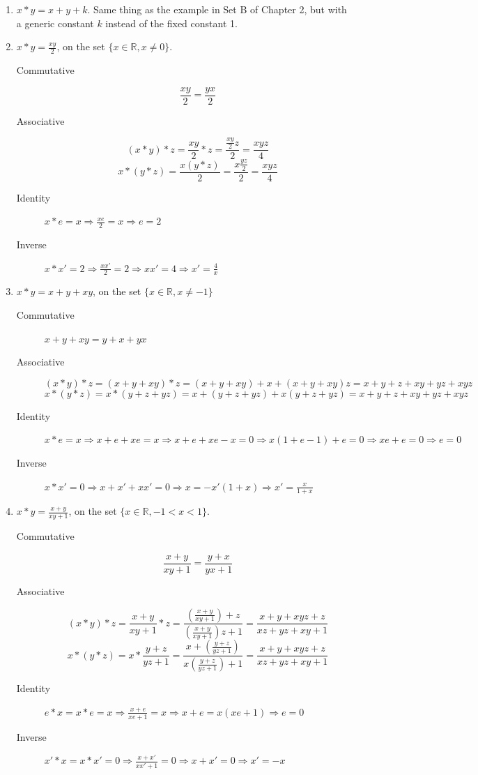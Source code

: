 \documentclass{article}
\begin{document}
\begin{enumerate}
    \item $x * y = x + y + k$. Same thing as the example in Set B of Chapter 2, but with a generic constant $k$ instead of the fixed constant 1.
    \item $x * y = \frac{xy}{2}$, on the set $\{x \in \mathbb{R}, x \ne 0\}$.
    \begin{description}
        \item [Commutative] 
            $$\frac{xy}{2} = \frac{yx}{2}$$
        \item [Associative]
        $$(x * y) * z = \frac{xy}{2} * z = \frac{\frac{xy}{2}z}{2} = \frac{xyz}{4}$$
        $$x * (y * z) = \frac{x(y * z)}{2} = \frac{x\frac{yz}{2}}{2} = \frac{xyz}{4}$$
        \item [Identity] $x * e = x \Rightarrow \frac{xe}{2} = x \Rightarrow e = 2$
        \item [Inverse] $x * x' = 2 \Rightarrow \frac{xx'}{2} = 2 \Rightarrow xx' = 4 \Rightarrow x' = \frac{4}{x}$
    \end{description}
    \item $x * y = x + y + xy$, on the set $\{x \in \mathbb{R}, x \ne -1\}$
    \begin{description}
        \item [Commutative] $x + y + xy = y + x + yx$
        \item [Associative]
        $$(x * y) * z = (x + y + xy) * z = (x + y + xy) + x + (x + y + xy)z = x + y + z + xy + yz + xyz$$
        $$x * (y * z) = x * (y + z + yz) = x + (y + z + yz) + x(y + z + yz) = x + y + z + xy + yz + xyz$$
        \item [Identity] $x * e = x \Rightarrow x + e + xe = x \Rightarrow x + e + xe - x = 0 \Rightarrow x(1 + e - 1) + e = 0 \Rightarrow xe + e = 0 \Rightarrow e = 0$
        \item [Inverse] $x * x' = 0 \Rightarrow x + x'+ xx' = 0 \Rightarrow x = -x'(1 + x) \Rightarrow x' = \frac{x}{1+x}$
    \end{description}
    \item $x * y = \frac{x + y}{xy + 1}$, on the set $\{x \in \mathbb{R}, -1 < x < 1\}$.
    \begin{description}
        \item [Commutative]
            $$\frac{x + y}{xy + 1} = \frac{y + x}{yx + 1}$$
        \item [Associative]
            $$(x * y) * z = \frac{x + y}{xy + 1} * z = \frac{\left(\frac{x + y}{xy + 1}\right) + z}{\left(\frac{x + y}{xy + 1}\right)z + 1} = \frac{x + y + xyz + z}{xz + yz + xy + 1}$$
            $$x * (y * z) = x * \frac{y + z}{yz + 1} = \frac{x + \left(\frac{y + z}{yz + 1}\right)}{x\left(\frac{y + z}{yz + 1}\right) + 1} = \frac{x + y + xyz + z}{xz + yz + xy + 1}$$
        \item [Identity] $e * x = x * e = x \Rightarrow \frac{x + e}{xe + 1} = x \Rightarrow x + e = x(xe + 1) \Rightarrow e = 0$
        \item [Inverse] $x' * x = x * x' = 0 \Rightarrow \frac{x + x'}{xx' + 1} = 0 \Rightarrow x + x' = 0 \Rightarrow x' = -x$
    \end{description}
\end{enumerate}
\end{document}
